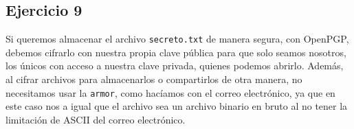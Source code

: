 \subsection{Ejercicio 9}
\graphicspath{ {img/09} }

Si queremos almacenar el archivo \texttt{secreto.txt} de manera segura, con OpenPGP, debemos cifrarlo con nuestra propia clave pública para que solo seamos nosotros, los únicos con acceso a nuestra clave privada, quienes podemos abrirlo. Además, al cifrar archivos para almacenarlos o compartirlos de otra manera, no necesitamos usar la \texttt{armor}, como hacíamos con el correo electrónico, ya que en este caso nos a igual que el archivo sea un archivo binario en bruto al no tener la limitación de ASCII del correo electrónico.